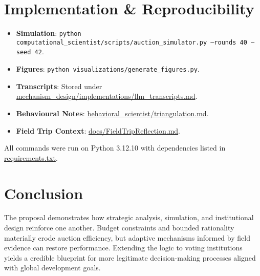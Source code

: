 \documentclass[11pt]{article}
\begin{document}
\section{Implementation \& Reproducibility}
\begin{itemize}[leftmargin=*]
  \item \textbf{Simulation}: \texttt{python computational\_scientist/scripts/auction\_simulator.py --rounds 40 --seed 42}.
  \item \textbf{Figures}: \texttt{python visualizations/generate\_figures.py}.
  \item \textbf{Transcripts}: Stored under \href{../mechanism_design/implementations/llm_transcripts.md}{mechanism\_design/implementations/llm\_transcripts.md}.
  \item \textbf{Behavioural Notes}: \href{../behavioral_scientist/triangulation.md}{behavioral\_scientist/triangulation.md}.
  \item \textbf{Field Trip Context}: \href{FieldTripReflection.md}{docs/FieldTripReflection.md}.
\end{itemize}
All commands were run on Python 3.12.10 with dependencies listed in \href{../requirements.txt}{requirements.txt}.

\section{Conclusion}
The proposal demonstrates how strategic analysis, simulation, and institutional design reinforce one another. Budget constraints and bounded rationality materially erode auction efficiency, but adaptive mechanisms informed by field evidence can restore performance. Extending the logic to voting institutions yields a credible blueprint for more legitimate decision-making processes aligned with global development goals.
\end{document}
